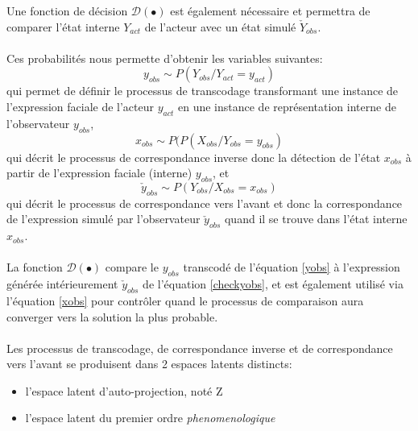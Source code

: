 \documentclass[overfullbox, poster]{polytech/polytech}
\begin{document}
Une fonction de décision $\mathcal{D}(\bullet )$ est également nécessaire et permettra de comparer l'état interne $Y_{act}$ de l'acteur avec un état simulé $\check{Y}_{obs}$.\\
\\
Ces probabilités nous permette d'obtenir les variables suivantes:
\begin{equation}
y_{obs}\sim P(Y_{obs}/Y_{act}= y_{act})
\label{yobs}
\end{equation}
qui permet de définir le processus de transcodage transformant une instance de l'expression faciale de l'acteur $y_{act}$ en une instance de représentation interne de l'observateur $y_{obs}$,
\begin{equation}
x_{obs}\sim P(P(X_{obs}/Y_{obs}= y_{obs})
\label{xobs}
\end{equation}
qui décrit le processus de correspondance inverse donc la détection de l'état $x_{obs}$ à partir de l'expression faciale (interne) $y_{obs}$, et
\begin{equation}
\check{y}_{obs}\sim P(Y_{obs}/X_{obs}= x_{obs})
\label{checkyobs}
\end{equation}
qui décrit le processus de correspondance vers l'avant et donc la correspondance de l'expression simulé par l'observateur $\check{y}_{obs}$ quand il se trouve dans l'état interne $x_{obs}$.\\
\\
La fonction $\mathcal{D}(\bullet )$ compare le $y_{obs}$ transcodé de l'équation \eqref{yobs} à l'expression générée intérieurement $\check{y}_{obs}$ de l'équation \eqref{checkyobs}, et est également utilisé via l'équation \eqref{xobs} pour contrôler quand le processus de comparaison aura converger vers la solution la plus probable.\\
\\
Les processus de transcodage, de correspondance inverse et de correspondance vers l'avant se produisent dans 2 espaces latents distincts:
\begin{itemize}
\item l'espace latent d'auto-projection, noté Z
\item l'espace latent du premier ordre \textit{phenomenologique}\\
\end{itemize}
\end{document}
